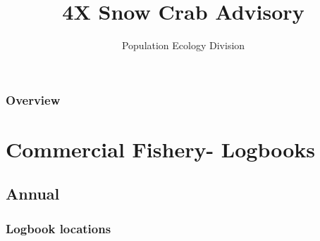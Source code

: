
\title[4X Advisory]{4X Snow Crab Advisory} %

\author{Population Ecology Division} %
\date{\the\year} %



\begin{frame}
\titlepage %
\end{frame}

\begin{frame}
\frametitle{Overview} %
\tableofcontents %
\end{frame}



\section{Commercial Fishery- Logbooks}
\subsection{Annual}

\begin{frame}
\frametitle{Logbook locations}
\begin{figure}
    \centering
   \
   \
   \
  
\end{figure}
\end{frame}


